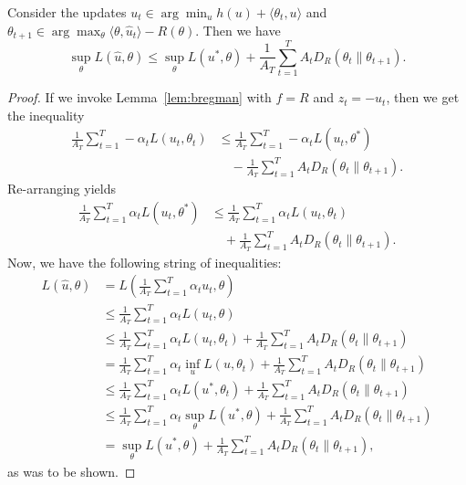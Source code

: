 \documentclass[paper.tex]{subfiles}
\begin{document}
\begin{proposition}
\label{prop:method-2}
Consider the updates $u_t \in \arg\min_{u} h(u) + \langle \theta_t, u \rangle$ 
and $\theta_{t+1} \in \arg\max_{\theta} \langle \theta, \hat{u}_t \rangle - R(\theta)$. 
Then we have 
\begin{equation}
\sup_{\theta} L(\hat{u}, \theta) \leq \sup_{\theta} L(u^*, \theta) + \frac{1}{A_T} \sum_{t=1}^T A_tD_{R}(\theta_t \| \theta_{t+1}).
\end{equation}
\end{proposition}
\begin{proof}
If we invoke Lemma~\ref{lem:bregman} with $f=R$ and $z_t=-u_t$, then we get 
the inequality
\begin{align}
\frac{1}{A_T} \sum_{t=1}^T -\alpha_t L(u_t, \theta_t) 
&\leq \frac{1}{A_T} \sum_{t=1}^T -\alpha_t L(u_t, \theta^*) \\
&\quad - \frac{1}{A_T} \sum_{t=1}^T A_tD_R(\theta_t \| \theta_{t+1}). \nonumber
\end{align}
Re-arranging yields
\begin{align}
\frac{1}{A_T }\sum_{t=1}^T \alpha_t L(u_t, \theta^*) 
&\leq \frac{1}{A_T} \sum_{t=1}^T \alpha_t L(u_t, \theta_t) \\
&\quad+ \frac{1}{A_T} \sum_{t=1}^T A_tD_R(\theta_t \| \theta_{t+1}). 
\end{align}
Now, we have the following string of inequalities:
\begin{align*}
L(\hat{u}, \theta) &= L\left(\frac{1}{A_T} \sum_{t=1}^T \alpha_t u_t, \theta\right) \\
 &\leq \frac{1}{A_T} \sum_{t=1}^T \alpha_t L(u_t, \theta) \\
 &\leq \frac{1}{A_T} \sum_{t=1}^T \alpha_t L(u_t, \theta_t) + \frac{1}{A_T} \sum_{t=1}^T A_t D_R(\theta_t \| \theta_{t+1}) \\
 &= \frac{1}{A_T} \sum_{t=1}^T \alpha_t \inf_{u} L(u, \theta_t) + \frac{1}{A_T} \sum_{t=1}^T A_tD_R(\theta_t \| \theta_{t+1}) \\
 &\leq \frac{1}{A_T} \sum_{t=1}^T \alpha_t L(u^*, \theta_t) + \frac{1}{A_T} \sum_{t=1}^T A_tD_R(\theta_t \| \theta_{t+1}) \\
 &\leq \frac{1}{A_T} \sum_{t=1}^T \alpha_t \sup_{\theta} L(u^*, \theta) + \frac{1}{A_T} \sum_{t=1}^T A_tD_R(\theta_t \| \theta_{t+1}) \\
 &= \sup_{\theta} L(u^*, \theta) + \frac{1}{A_T} \sum_{t=1}^T A_tD_R(\theta_t \| \theta_{t+1}),
\end{align*}
as was to be shown.
\end{proof}
\end{document}
